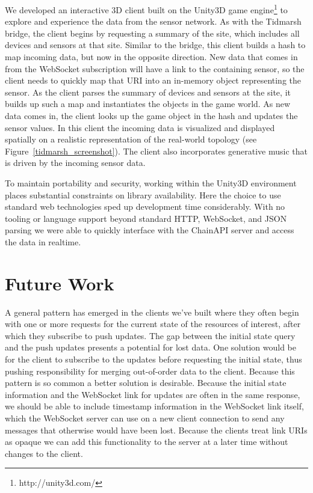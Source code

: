 \documentclass{acm_proc_article-sp}
\begin{document}
We developed an interactive 3D client built on the Unity3D game
engine\footnote{http://unity3d.com/} to explore and experience the data from
the sensor network. As with the Tidmarsh bridge, the client begins by
requesting a summary of the site, which includes all devices and sensors at
that site. Similar to the bridge, this client builds a hash to map incoming
data, but now in the opposite direction. New data that comes in from the
WebSocket subscription will have a link to the containing sensor, so the client
needs to quickly map that URI into an in-memory object representing the sensor.
As the client parses the summary of devices and sensors at the site, it builds
up such a map and instantiates the objects in the game world. As new data comes
in, the client looks up the game object in the hash and updates the sensor
values. In this client the incoming data is visualized and displayed spatially
on a realistic representation of the real-world topology (see
Figure~\ref{tidmarsh_screenshot}). The client also incorporates generative
music that is driven by the incoming sensor data.

To maintain portability and security, working within the Unity3D environment
places substantial constraints on library availability. Here the choice to use
standard web technologies sped up development time considerably. With no
tooling or language support beyond standard HTTP, WebSocket, and JSON parsing
we were able to quickly interface with the ChainAPI server and access the data
in realtime.

\section{Future Work}

A general pattern has emerged in the clients we've built where they often begin
with one or more requests for the current state of the resources of interest,
after which they subscribe to push updates. The gap between the initial state
query and the push updates presents a potential for lost data. One solution
would be for the client to subscribe to the updates before requesting the
initial state, thus pushing responsibility for merging out-of-order data to the
client. Because this pattern is so common a better solution is desirable.
Because the initial state information and the WebSocket link for updates are
often in the same response, we should be able to include timestamp information
in the WebSocket link itself, which the WebSocket server can use on a new
client connection to send any messages that otherwise would have been lost.
Because the clients treat link URIs as opaque we can add this functionality to
the server at a later time without changes to the client.
\end{document}
